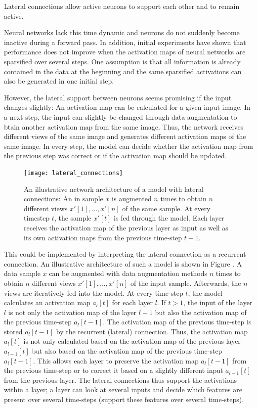 \begin{claim}
	Lateral connections allow active neurons to support each other and to remain active.
\end{claim}


Neural networks lack this time dynamic and neurons do not suddenly become inactive during a forward pass. 
In addition, initial experiments have shown that performance does not improve when the activation maps of neural networks are sparsified over several steps.
One assumption is that all information is already contained in the data at the beginning and the same sparsified activations can also be generated in one initial step.

However, the lateral support between neurons seems promising if the input changes slightly:
An activation map can be calculated for a given input image. In a next step, the input can slightly be changed through data augmentation to btain another activation map from the same image. Thus, the network receives different views of the same image and generates different activation maps of the same image. In every step, the model can decide whether the activation map from the previous step was correct or if the activation map should be updated.

\begin{figure}[h]
    \centering
    \texttt{[image: lateral\_connections]}
    \caption[Illustrative network architecture of a model with lateral connections]{An illustrative network architecture of a model with lateral connections: An in sample $x$ is augmented $n$ times to obtain $n$ different views $x'[1], ..., x'[n]$ of the same sample. At every timestep $t$, the sample $x'[t]$ is fed through the model. Each layer receives the activation map of the previous layer as input as well as its own activation maps from the previous time-step $t-1$.}
\end{figure}

This could be implemented by interpreting the lateral connection as a recurrent connection.
An illustrative architecture of such a model is shown in Figure .
A data sample $x$ can be augmented with data augmentation methods $n$ times to obtain $n$ different views $x'[1], ..., x'[n]$ of the input sample.
Afterwards, the $n$ views are iteratively fed into the model.
At every time-step $t$, the model calculates an activation map $a_l[t]$ for each layer $l$.
If $t>1$, the input of the layer $l$ is not only the activation map of the layer $l-1$ but also the activation map of the previous time-step $a_l[t-1]$.
The activation map of the previous time-step is stored $a_l[t-1]$ by the recurrent (lateral) connection.
Thus, the activation map $a_l[t]$ is not only calculated based on the activation map of the previous layer $a_{l-1}[t]$ but also based on the activation map of the previous time-step $a_l[t-1]$.
This allows each layer to preserve the activation map $a_l[t-1]$ from the previous time-step or to correct it based on a slightly different input $a_{l-1}[t]$ from the previous layer. The lateral connections thus support the activations within a layer; a layer can look at several inputs and decide which features are present over several time-steps (support these features over several time-steps).

